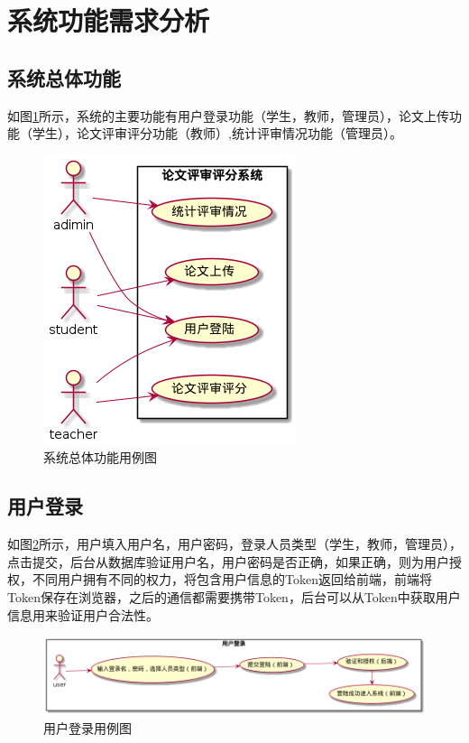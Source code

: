 \section{系统功能需求分析}

\subsection{系统总体功能}

如图\ref{system-usecase}所示，系统的主要功能有用户登录功能（学生，教师，管理员），论文上传功能（学生），论文评审评分功能（教师）,统计评审情况功能（管理员）。

\begin{figure}[H]
    \centering
    \includegraphics[scale = 0.6]{out/uml/用例图/系统总体功能用例图/系统总体功能用例图.png}
    \caption{\song\wuhao 系统总体功能用例图}
    \label{system-usecase}
\end{figure}

\subsection{用户登录}

如图\ref{login-usecase}所示，用户填入用户名，用户密码，登录人员类型（学生，教师，管理员），点击提交，后台从数据库验证用户名，用户密码是否正确，如果正确，则为用户授权，不同用户拥有不同的权力，将包含用户信息的Token返回给前端，前端将Token保存在浏览器，之后的通信都需要携带Token，后台可以从Token中获取用户信息用来验证用户合法性。

\begin{figure}[H]
    \centering
    \includegraphics[scale = 0.45]{out/uml/用例图/1-用户登录用例图/1-用户登录用例图.png}
    \caption{\song\wuhao 用户登录用例图}
    \label{login-usecase}
\end{figure}

